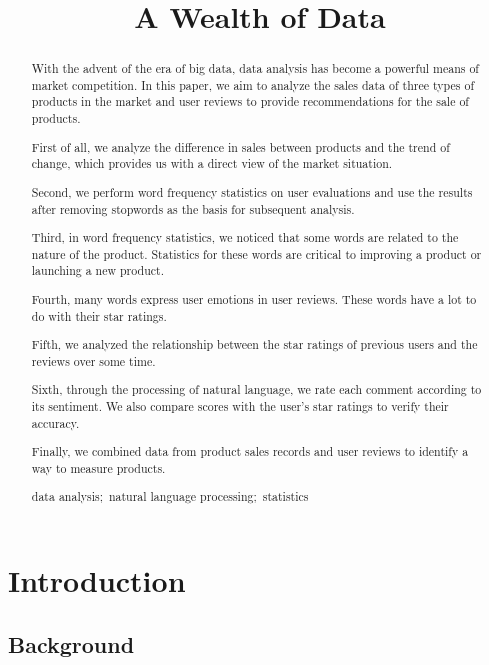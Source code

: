 \documentclass{mcmthesis}
\title{A Wealth of Data}
\begin{document}
	\begin{abstract}
		
		With the advent of the era of big data, data analysis has become a powerful means of market competition. In this paper, we aim to analyze the sales data of three types of products in the market and user reviews to provide recommendations for the sale of products.
		
		First of all, we analyze the difference in sales between products and the trend of change, which provides us with a direct view of the market situation.
		
		Second, we perform word frequency statistics on user evaluations and use the results after removing stopwords as the basis for subsequent analysis.
		
		Third, in word frequency statistics, we noticed that some words are related to the nature of the product. Statistics for these words are critical to improving a product or launching a new product.
		
		Fourth, many words express user emotions in user reviews. These words have a lot to do with their star ratings.
		
		Fifth, we analyzed the relationship between the star ratings of previous users and the reviews over some time.
		
		Sixth, through the processing of natural language, we rate each comment according to its sentiment. We also compare scores with the user's star ratings to verify their accuracy.
		
		Finally, we combined data from product sales records and user reviews to identify a way to measure products.
		\begin{keywords}
			data analysis;\ natural language processing;\ statistics
		\end{keywords}
	\end{abstract}
	\maketitle
	\newpage
	\tableofcontents
	\newpage
	
	
	
	\section{Introduction}
	
	\subsection{Background}
	
\end{document}
